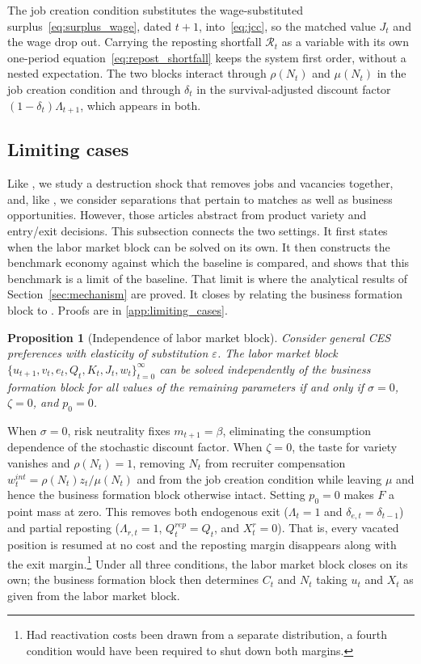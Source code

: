 \documentclass[authoryear, review, 12pt]{elsarticle}
\newtheorem{proposition}{Proposition}
\begin{document}
	The job creation condition substitutes the wage-substituted surplus~\eqref{eq:surplus_wage},
dated $t+1$, into~\eqref{eq:jcc}, so the matched value $J_t$ and the wage drop out.
Carrying the reposting shortfall $\mathcal{R}_t$ as a variable with its own one-period
equation~\eqref{eq:repost_shortfall} keeps the system first order, without a nested
expectation. The two blocks interact through $\rho(N_t)$ and $\mu(N_t)$ in the job creation
condition and through $\delta_t$ in the survival-adjusted discount factor
$(1-\delta_t)\Lambda_{t+1}$, which appears in both.

\subsection{Limiting cases}

Like \citet{coles_2018}, we study a destruction shock that removes jobs and vacancies together, and, like \citet{gabrovski_2025}, we consider separations that pertain to matches as well as business opportunities. However, those articles abstract from product variety and entry/exit decisions. This subsection connects the two settings. It
first states when the labor market block can be solved on its own. It then constructs the
benchmark economy against which the baseline is compared, and shows that this benchmark is
a limit of the baseline. That limit is where the analytical results of
Section~\ref{sec:mechanism} are proved. It closes by relating the business formation block
to \citet{bilbiie_2012}. Proofs are in \ref{app:limiting_cases}.

\begin{proposition}[Independence of labor market block]
	\label{prop:independence}
	Consider general CES preferences with elasticity of
	substitution $\varepsilon$. The labor market
	block $\{u_{t+1}, v_t, e_t, Q_t, K_t, J_t, w_t\}_{t=0}^{\infty}$
	can be solved independently of the business formation
	block for all values of the remaining parameters if and only if $\sigma=0$, $\zeta=0$,
	and $p_0=0$.
\end{proposition}

When $\sigma=0$, risk neutrality fixes $m_{t+1}=\beta$, 
eliminating the consumption dependence of the stochastic 
discount factor. When $\zeta=0$, the taste for variety 
vanishes and $\rho(N_t)=1$, removing $N_t$ from recruiter 
compensation $w_t^{int}=\rho(N_t)z_t/\mu(N_t)$ and from 
the job creation condition while leaving $\mu$ and hence 
the business formation block otherwise intact. Setting
$p_0=0$ makes $F$ a point mass at zero. This removes both endogenous exit ($\Lambda_t=1$ and
$\delta_{e,t}=\delta_{t-1}$) and partial reposting ($\Lambda_{r,t}=1$, $Q_t^{rep}=Q_t$, and $X_t^r=0$). That is,
every vacated position is resumed at no cost and the
reposting margin disappears along with the exit margin.\footnote{Had
reactivation costs been drawn from a separate distribution,
a fourth condition would have been required to shut down both margins.} Under all three conditions, the labor market block 
closes on its own; the business formation block then 
determines $C_t$ and $N_t$ taking $u_t$ and $X_t$ as 
given from the labor market block.
\end{document}
